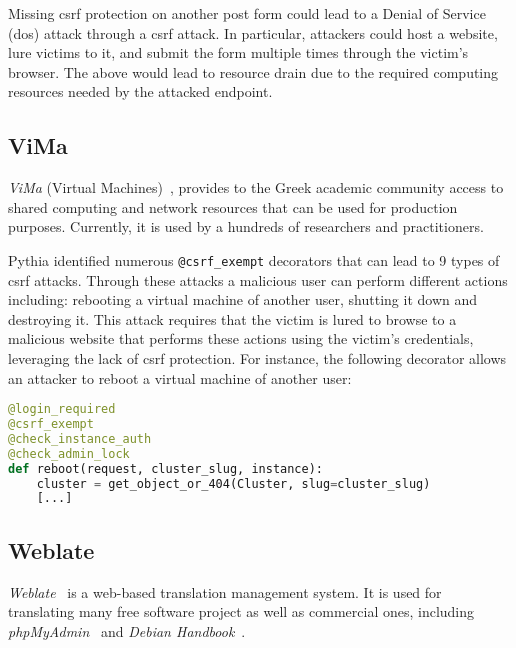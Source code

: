 Missing {\sc csrf} protection on
another {\sc post} form could lead to
a Denial of Service ({\sc d}o{\sc s})
attack through a {\sc csrf} attack.
In particular,
attackers could host a website,
lure victims to it,
and submit the form multiple times
through the victim's browser.
The above would lead to resource drain
due to the required computing resources
needed by the attacked endpoint.

\subsection{ViMa}
\label{sec:vima}

{\it ViMa} (Virtual Machines)~\cite{vima},
provides to the Greek academic community
access to shared computing and network resources that can be used
for production purposes.
Currently,
it is used by a hundreds of researchers
and practitioners.

Pythia identified numerous
{\tt @csrf\_exempt} decorators
that can lead to 9 types of
{\sc csrf} attacks.
Through these attacks a malicious
user can perform different actions including:
rebooting a virtual machine of another user,
shutting it down and destroying it. This attack
requires that the victim is lured to browse to a malicious
website that performs these actions using the
victim's credentials, leveraging the lack of
{\sc csrf} protection.
For instance,
the following decorator
allows an attacker to reboot
a virtual machine of another user:

\vspace{0.8mm}
\begin{lstlisting}[language=Python, basicstyle=\footnotesize\ttfamily]
@login_required
@csrf_exempt
@check_instance_auth
@check_admin_lock
def reboot(request, cluster_slug, instance):
    cluster = get_object_or_404(Cluster, slug=cluster_slug)
    [...]
\end{lstlisting}
\vspace{0.8mm}

\subsection{Weblate}
\label{sec:weblate}
\begin{comment}
https://github.com/WeblateOrg/weblate/blob/d84dfdbdfaba0d31588fd3bc9253e6d75d03e644/weblate/trans/views/basic.py#L91-L129
\end{comment}
{\it Weblate}~\cite{weblate} is a web-based
translation management system.
It is  used for translating many free
software project as well as commercial ones,
including
{\it phpMyAdmin}~\cite{phpma} and
{\it Debian Handbook}~\cite{dhbk}.

